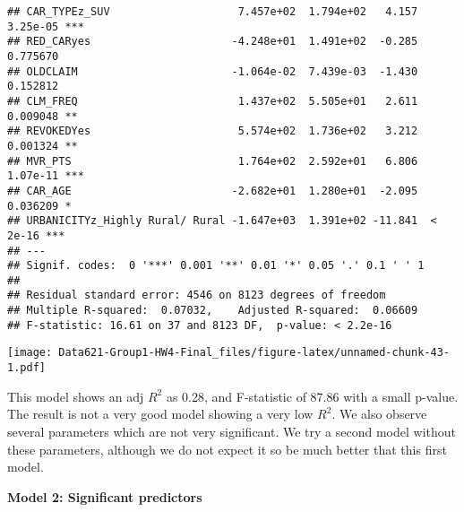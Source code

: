 \documentclass[]{article}
\begin{document}
\begin{verbatim}
## CAR_TYPEz_SUV                    7.457e+02  1.794e+02   4.157 3.25e-05 ***
## RED_CARyes                      -4.248e+01  1.491e+02  -0.285 0.775670    
## OLDCLAIM                        -1.064e-02  7.439e-03  -1.430 0.152812    
## CLM_FREQ                         1.437e+02  5.505e+01   2.611 0.009048 ** 
## REVOKEDYes                       5.574e+02  1.736e+02   3.212 0.001324 ** 
## MVR_PTS                          1.764e+02  2.592e+01   6.806 1.07e-11 ***
## CAR_AGE                         -2.682e+01  1.280e+01  -2.095 0.036209 *  
## URBANICITYz_Highly Rural/ Rural -1.647e+03  1.391e+02 -11.841  < 2e-16 ***
## ---
## Signif. codes:  0 '***' 0.001 '**' 0.01 '*' 0.05 '.' 0.1 ' ' 1
## 
## Residual standard error: 4546 on 8123 degrees of freedom
## Multiple R-squared:  0.07032,    Adjusted R-squared:  0.06609 
## F-statistic: 16.61 on 37 and 8123 DF,  p-value: < 2.2e-16
\end{verbatim}

\texttt{[image: Data621-Group1-HW4-Final\_files/figure-latex/unnamed-chunk-43-1.pdf]}

This model shows an adj \(R^2\) as 0.28, and F-statistic of 87.86 with a
small p-value. The result is not a very good model showing a very low
\(R^2\). We also observe several parameters which are not very
significant. We try a second model without these parameters, although we
do not expect it so be much better that this first model.

\textbf{Model 2: Significant predictors}
\end{document}

